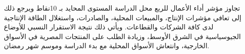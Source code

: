 تجاوز مؤشر أداء الأعمال للربع محل الدراسة المستوى المحايد بـ 10نقاط ويرجع ذلك إلى تعافي مؤشرات الإنتاج، والمبيعات المحلية، والصادرات، واستغلال الطاقة الإنتاجية لدى كافة الشركات والقطاعات. ويأتي ذلك نتيجة الاستقرار النسبي للأوضاع الجيوسياسية في الشرق الأوسط، وزيادة الطلب على المنتجات المصرية في الأسواق الخارجية، وانتعاش الأسواق المحلية مع بدء الدراسة وموسم شهر رمضان.
